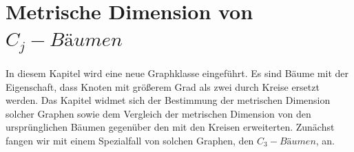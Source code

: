 \newpage
\chapter{Metrische Dimension von $C_j-Bäumen$}
\label{kapcjbaume}
In diesem Kapitel wird eine neue Graphklasse eingeführt. Es sind Bäume mit der Eigenschaft, dass Knoten mit größerem Grad als zwei durch Kreise ersetzt werden. Das Kapitel widmet sich der Bestimmung der metrischen Dimension solcher Graphen sowie dem Vergleich der metrischen Dimension von den ursprünglichen Bäumen gegenüber den mit den Kreisen erweiterten. Zunächst fangen wir mit einem Spezialfall von solchen Graphen, den $C_3-Bäumen$, an.
